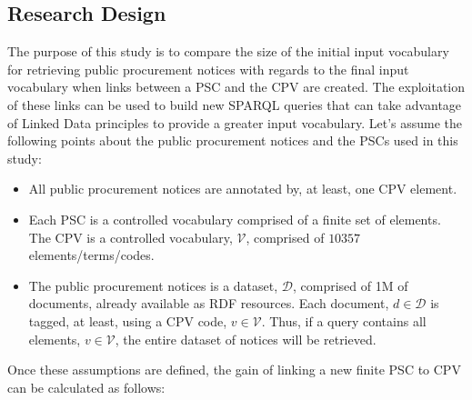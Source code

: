 \subsection{Research Design}
The purpose of this study is to compare the size of the initial input vocabulary for retrieving public procurement notices 
with regards to the final input vocabulary when links between a PSC and the CPV are created. The exploitation of these links can be used 
to build new SPARQL queries that can take advantage of Linked Data principles to provide a greater input vocabulary. Let's assume the following points about the 
public procurement notices and the PSCs used in this study:
\begin{itemize}
 \item All public procurement notices are annotated by, at least, one CPV element.
 \item Each PSC is a controlled vocabulary comprised of a finite set of elements. The CPV is a controlled vocabulary, $\mathcal{V}$, comprised of $10357$ elements/terms/codes.
 \item The public procurement notices is a dataset, $\mathcal{D}$, comprised of 1M of documents, 
 already available as RDF resources. Each document, $d \in \mathcal{D}$ is tagged, at least, using a CPV code, $v \in \mathcal{V}$. Thus, 
 if a query contains all elements, $v \in \mathcal{V}$, the entire dataset of notices will be retrieved.
\end{itemize}
Once these assumptions are defined, the gain of linking a new finite PSC to CPV can be calculated as follows:
